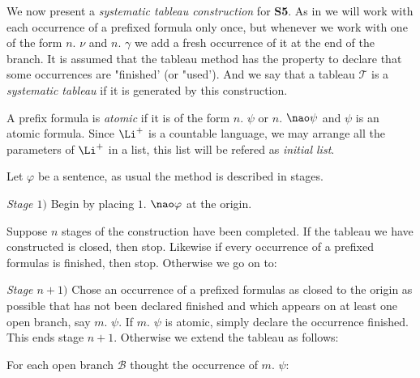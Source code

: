 \begin{defn}
We now present a \textit{systematic tableau construction} for \textbf{S5}. As in \cite{Fitting83}  we will work with each occurrence of a prefixed formula only once, but whenever we work with one of the form $n.$ $ \nu$ and $n.$ $ \gamma$ we add a fresh occurrence of it at the end of the branch. It is assumed that the tableau method has the property to declare that some occurrences are "finished' (or "used'). And we say that a tableau $\mathcal{T}$ is a \textit{systematic tableau} if it is generated by this construction.

\qquad A prefix formula is \textit{atomic} if it is of the form $n.$ $\psi$ or $n.$ $\nao\psi$ and $\psi$ is an atomic formula. Since $\Li^{+}$ is a countable language, we may arrange all the parameters of $\Li^{+}$ in a list, this list will be refered as \textit{initial list}.

\qquad Let $\varphi$ be a sentence, as usual the method is described in stages.

\qquad \textit{Stage $1)$} Begin by placing $1.$ $\nao \varphi$ at the origin.

\qquad Suppose $n$ stages of the construction have been completed. If the tableau we have constructed is closed, then stop. Likewise if every occurrence of a prefixed formulas is finished, then stop. Otherwise we go on to:

\qquad \textit{Stage $n+1)$} Chose an occurrence of a prefixed formulas as closed to the origin as possible that has not been declared finished and which appears on at least one open branch, say $m.$ $\psi$. If $m.$ $\psi$ is atomic, simply declare the occurrence finished. This ends stage $n+1$. Otherwise we extend the tableau as follows:

\qquad For each open branch $\mathcal{B}$ thought the occurrence of $m.$ $\psi$:


\end{defn}
